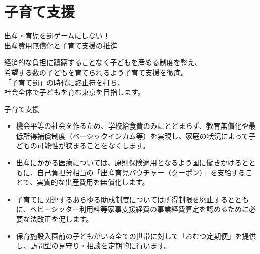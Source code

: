 \documentclass[dvipdfmx]{beamer}
\begin{document}
\section{子育て支援}
    \begin{frame}
        \sectionpage
        \begin{center}
            \begin{large}
                \alert{出産・育児を罰ゲームにしない！}\\\alert{出産費用無償化と子育て支援の推進}
            \end{large}
        \end{center}
        \begin{small}
            経済的な負担に躊躇することなく子どもを産める制度を整え、\\
            希望する数の子どもを育てられるよう子育て支援を徹底。\\
            「子育て罰」の時代に終止符を打ち、\\
            社会全体で子どもを育む東京を目指します。
        \end{small}
    \end{frame}

    \begin{frame}{子育て支援}{}
        \begin{small}
            \begin{itemize}
                \setlength{\itemsep}{2mm}
                \item 機会平等の社会を作るため、学校給食費のみにとどまらず、教育無償化や最低所得補償制度（ベーシックインカム等）を実現し、家庭の状況によって子どもの可能性が狭まることをなくします。
                \item 出産にかかる医療については、原則保険適用となるよう国に働きかけるとともに、自己負担分相当の「出産育児バウチャー（クーポン）」を支給することで、実質的な出産費用を無償化します。
                \item 子育てに関連するあらゆる助成制度については所得制限を廃止するとともに、ベビーシッター利用料等家事支援経費の事業経費算定を認めるために必要な法改正を促します。
                \item 保育施設入園前の子どもがいる全ての世帯に対して「おむつ定期便」を提供し、訪問型の見守り・相談を定期的に行います。
            \end{itemize}
        \end{small}
    \end{frame}
\end{document}
